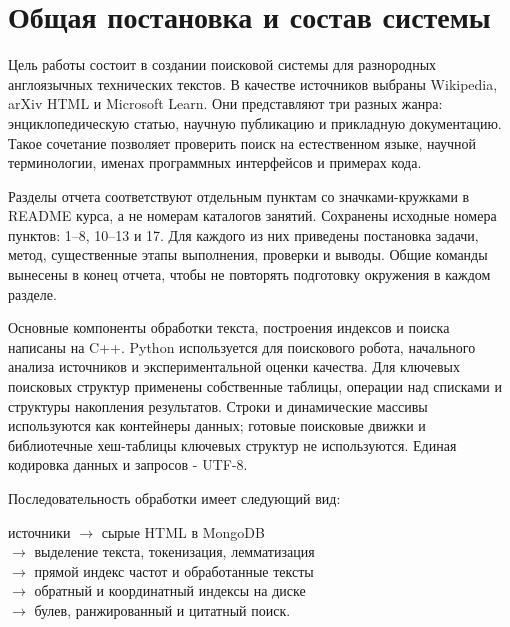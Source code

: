 \documentclass[pdf,unicode,12pt,a4paper,oneside,fleqn]{article}
\begin{document}
\hypersetup{pageanchor=false}


\hypersetup{pageanchor=true}

\tableofcontents
\clearpage
\section*{Общая постановка и состав системы}

Цель работы состоит в создании поисковой системы для разнородных англоязычных
технических текстов. В качестве источников выбраны Wikipedia, arXiv HTML и
Microsoft Learn. Они представляют три разных жанра: энциклопедическую статью,
научную публикацию и прикладную документацию. Такое сочетание позволяет
проверить поиск на естественном языке, научной терминологии, именах программных
интерфейсов и примерах кода.

Разделы отчета соответствуют отдельным пунктам со значками-кружками в README
курса, а не номерам каталогов занятий. Сохранены исходные номера пунктов:
1--8, 10--13 и 17. Для каждого из них приведены постановка задачи, метод,
существенные этапы выполнения, проверки и выводы. Общие команды вынесены
в конец отчета, чтобы не повторять подготовку окружения в каждом разделе.

Основные компоненты обработки текста, построения индексов и поиска написаны
на C++. Python используется для поискового робота, начального анализа источников
и экспериментальной оценки качества. Для ключевых поисковых структур применены
собственные таблицы, операции над списками и структуры накопления результатов.
Строки и динамические массивы используются как контейнеры данных; готовые
поисковые движки и библиотечные хеш-таблицы ключевых структур не используются.
Единая кодировка данных и запросов - UTF-8.

Последовательность обработки имеет следующий вид:
\begin{center}
источники $\longrightarrow$ сырые HTML в MongoDB\\[3pt]
$\longrightarrow$ выделение текста, токенизация, лемматизация\\[3pt]
$\longrightarrow$ прямой индекс частот и обработанные тексты\\[3pt]
$\longrightarrow$ обратный и координатный индексы на диске\\[3pt]
$\longrightarrow$ булев, ранжированный и цитатный поиск.
\end{center}
\end{document}

